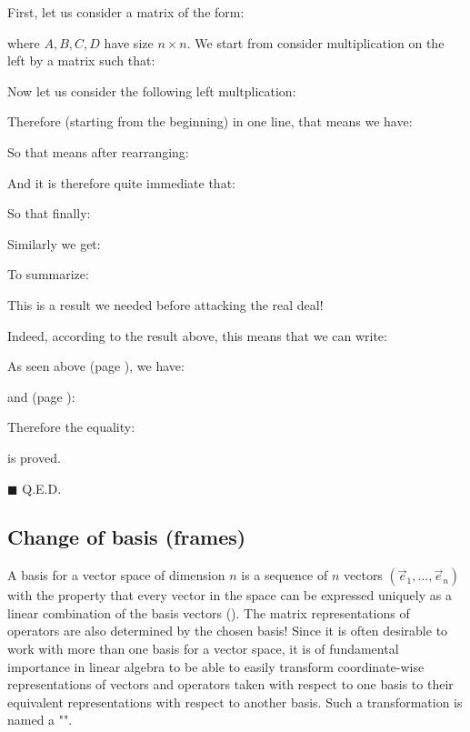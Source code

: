 	\begin{dem}
	First, let us consider a matrix of the form:
	
	where $A,B,C,D$ have size $n\times n$. We start from consider multiplication on the left by a matrix such that:
	
	Now let us consider the following left multplication:
	
	Therefore (starting from the beginning) in one line, that means we have:
	
	So that means after rearranging:
	
	And it is therefore quite immediate that:
	
	So that finally:
	 
	Similarly we get:
	
	To summarize:
	
	This is a result we needed before attacking the real deal!
	
	Indeed, according to the result above, this means that we can write:
	
	
	As seen above (page \pageref{determinant product}), we have:
	
	and (page \pageref{determinant of block-diagonal or block-triangular matrices}):
	
	Therefore the equality:
	
	is proved.
	\begin{flushright}
		$\blacksquare$  Q.E.D.
	\end{flushright}
	\end{dem}
	
	\pagebreak
	\subsection{Change of basis (frames)}\label{change of basis}
	A basis for a vector space of dimension $n$ is a sequence of $n$ vectors $(\vec{e}_1, …, \vec{e}_n)$ with the property that every vector in the space can be expressed uniquely as a linear combination of the basis vectors (). The matrix representations of operators are also determined by the chosen basis! Since it is often desirable to work with more than one basis for a vector space, it is of fundamental importance in linear algebra to be able to easily transform coordinate-wise representations of vectors and operators taken with respect to one basis to their equivalent representations with respect to another basis. Such a transformation is named a "".
	
